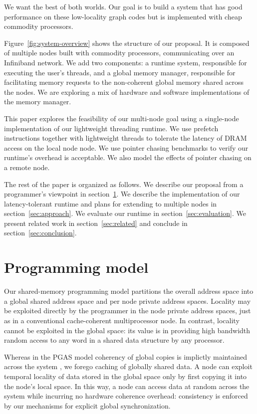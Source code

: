 \documentclass[10pt,nocopyrightspace,preprint]{sigplanconf}
\begin{document}
We want the best of both worlds. Our goal is to build a system that
has good performance on these low-locality graph codes but is
implemented with cheap commodity processors.

Figure~\ref{fig:system-overview} shows the structure of our
proposal. It is composed of multiple nodes built with commodity
processors, communicating over an Infiniband network. We add two
components: a runtime system, responsible for executing the user's
threads, and a global memory manager, responsible for facilitating
memory requests to the non-coherent global memory shared across the
nodes.  We are exploring a mix of hardware and software
implementations of the memory manager.

This paper explores the feasibility of our multi-node goal using a
single-node implementation of our lightweight threading runtime. We
use prefetch instructions together with lightweight threads to
tolerate the latency of DRAM access on the local node node. We use
pointer chasing benchmarks to verify our runtime's overhead is
acceptable. We also model the effects of pointer chasing on a remote
node.

The rest of the paper is organized as follows. We describe our
proposal from a programmer's viewpoint in section~\ref{sec:model}. We
describe the implementation of our latency-tolerant runtime and plans
for extending to multiple nodes in section~\ref{sec:approach}. We
evaluate our runtime in section~\ref{sec:evaluation}.  We present
related work in section~\ref{sec:related} and conclude in
section~\ref{sec:conclusion}.

\section{Programming model}
\label{sec:model}

Our shared-memory programming model partitions the overall address
space into a global shared address space and per node private address
spaces.  Locality may be exploited directly by the programmer in the
node private address spaces, just as in a conventional cache-coherent
multiprocessor node.  In contrast, locality cannot be exploited in the
global space: its value is in providing high bandwidth random access
to any word in a shared data structure by any processor.

Whereas in the PGAS model coherency of global copies is implictly
maintained across the system , we forego caching of globally shared
data.  A node can exploit temporal locality of data stored in
the global space only by first copying it into the node's local space.
In this way, a node can access data at random across the system while
incurring no hardware coherence overhead: consistency is enforced by
our mechanisms for explicit global synchronization.
\end{document}
